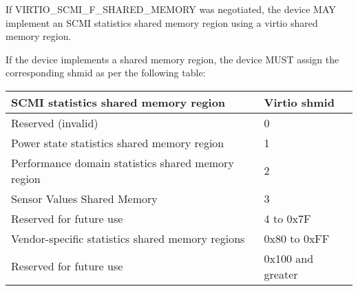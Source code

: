 If VIRTIO_SCMI_F_SHARED_MEMORY was negotiated, the device MAY implement
an SCMI statistics shared memory region using a virtio shared memory
region.

If the device implements a shared memory region, the device MUST assign
the corresponding shmid as per the following table:

\begin{tabular}{|l|l|}
\hline
SCMI statistics shared memory region & Virtio shmid \\
\hline \hline
Reserved (invalid) & 0 \\
\hline
Power state statistics shared memory region & 1 \\
\hline
Performance domain statistics shared memory region & 2 \\
\hline
Sensor Values Shared Memory & 3 \\
\hline
Reserved for future use & 4 to 0x7F \\
\hline
Vendor-specific statistics shared memory regions & 0x80 to 0xFF \\
\hline
Reserved for future use & 0x100 and greater \\
\hline
\end{tabular}
